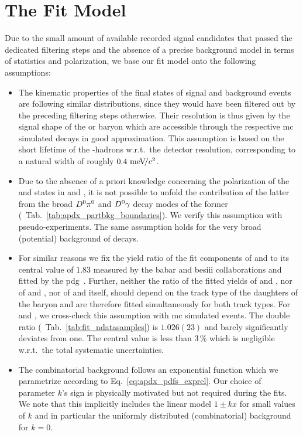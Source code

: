 \section{The Fit Model}
\label{sec:fit_model}
Due to the small amount of available recorded signal candidates that passed the dedicated filtering steps and the absence of a precise background model in terms of statistics and polarization, we base our fit model onto the following assumptions:
\begin{itemize}
    \item The kinematic properties of the final states of signal and background events are following similar distributions, since they would have been filtered out by the preceding filtering steps otherwise. Their resolution is thus given by the signal shape of the \Lb or \Xibz baryon which are accessible through the respective \gls{mc} simulated decays in good approximation. This assumption is based on the short lifetime of the \bquark-hadrons w.r.t.\ the detector resolution, corresponding to a natural width of roughly $0.4\,{\mathrm{\,me\kern -0.1em V\!/}c^2}$.
    \item Due to the absence of a priori knowledge concerning the polarization of the \Dstarz and \Sz states in \decay{\Lb}{\Dstarz\Lz} and \decay{\Lb}{\Dz\Sz}, it is not possible to unfold the contribution of the latter from the broad ${{D}^0}{{\pi}^0}$ and ${{D}^0}\gamma$ decay modes of the former (\cf{}~Tab.~\ref{tab:apdx_partbkg_boundaries}). We verify this assumption with pseudo-experiments. The same assumption holds for the very broad (potential) background of \decay{\Xibz}{\Dz\Xiz} decays.
    \item For similar reasons we fix the yield ratio of the fit components of \decay{\Dstarz}{\Dz\piz} and \decay{\Dstarz}{\Dz\Pgamma} to its central value of $1.83$ measured by the \gls{babar} and \gls{besiii} collaborations and fitted by the \gls{pdg}~\cite{DstarBrs1,DstarBrs2,pdg}. Further, neither the ratio of the fitted yields of \decay{\Lb}{\Dz\Lz} and \decay{\Lb}{\Dstarz\Lz}, nor of \decay{\Xibz}{\Dz\Lz} and \decay{\Xibz}{\Dstarz\Lz}, nor of \decay{\Lb}{\Dz\Lz} and \decay{\Xibz}{\Dz\Lz} itself, should depend on the track type of the daughters of the \Lz baryon and are therefore fitted simultaneously for both track types. For \decay{\Lb}{\Dz\Lz} and \decay{\Xibz}{\Dz\Lz}, we cross-check this assumption with \gls{mc} simulated events. The double ratio (\cf{}~Tab.~\ref{tab:fit_ndatasamples}) is $1.026(23)$ and barely significantly deviates from one. The central value is less than $3\,\%$ which is negligible w.r.t.\ the total systematic uncertainties.
    \item The combinatorial background follows an exponential function which we parametrize according to Eq.~\eqref{eq:apdx_pdfs_exprel}. Our choice of parameter $k$'s sign is physically motivated but not required during the fits. We note that this implicitly includes the linear model $1 \pm kx$ for small values of $k$ and in particular the uniformly distributed (combinatorial) background for $k=0$.
\end{itemize}
